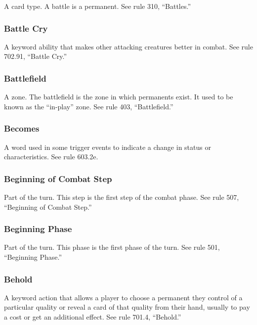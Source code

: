 {A card type. A battle is a permanent. See rule 310, “Battles.”

\subsubsection*{Battle Cry}

A keyword ability that makes other attacking creatures better in combat. See rule 702.91, “Battle Cry.”

\subsubsection*{Battlefield}

A zone. The battlefield is the zone in which permanents exist. It used to be known as the “in-play” zone. See rule 403, “Battlefield.”

\subsubsection*{Becomes}

A word used in some trigger events to indicate a change in status or characteristics. See rule 603.2e.

\subsubsection*{Beginning of Combat Step}

Part of the turn. This step is the first step of the combat phase. See rule 507, “Beginning of Combat Step.”

\subsubsection*{Beginning Phase}

Part of the turn. This phase is the first phase of the turn. See rule 501, “Beginning Phase.”

\subsubsection*{Behold}

A keyword action that allows a player to choose a permanent they control of a particular quality or reveal a card of that quality from their hand, usually to pay a cost or get an additional effect. See rule 701.4, “Behold.”

}
